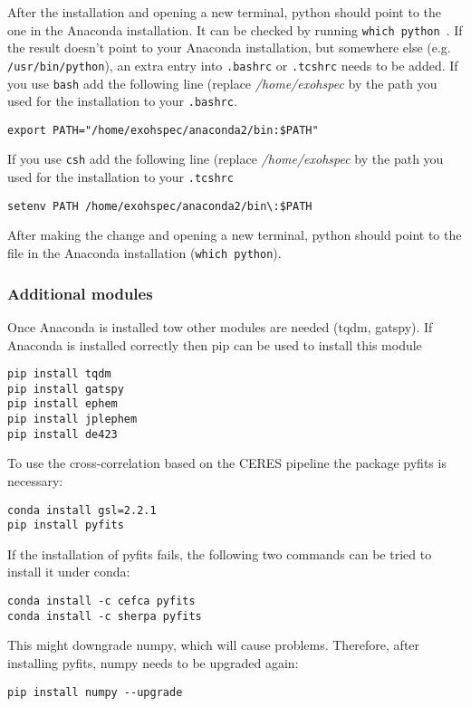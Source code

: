 \documentclass[10pt,a4paper]{article}
\begin{document}
After the installation and opening a new terminal, python should point to the one in the Anaconda installation. It can be checked by running \verb|which python|~. If the result doesn't point to your Anaconda installation, but somewhere else (e.g. \verb|/usr/bin/python|), an extra entry into \verb|.bashrc| or \verb|.tcshrc| needs to be added. If you use \verb|bash| add the following line (replace \textit{/home/exohspec} by the path you used for the installation to your \verb|.bashrc|. %
\begin{lstlisting}[style=base]
export PATH="/home/exohspec/anaconda2/bin:$PATH"
\end{lstlisting}
If you use \verb|csh| add the following line (replace \textit{/home/exohspec} by the path you used for the installation to your \verb|.tcshrc|
\begin{lstlisting}[style=base]
setenv PATH /home/exohspec/anaconda2/bin\:$PATH
\end{lstlisting}

After making the change and opening a new terminal, python should point to the file in the Anaconda installation (\verb|which python|).

\subsubsection{Additional modules}

\noindent Once Anaconda is installed tow other modules are needed (tqdm, gatspy). If Anaconda is installed correctly then pip can be used to install this module
\begin{lstlisting}[style=base]
pip install tqdm
pip install gatspy
pip install ephem
pip install jplephem
pip install de423
\end{lstlisting}

To use the cross-correlation based on the CERES pipeline the package pyfits is necessary:
\begin{lstlisting}[style=base]
conda install gsl=2.2.1
pip install pyfits
\end{lstlisting}

If the installation of pyfits fails, the following two commands can be tried to install it under conda:
\begin{lstlisting}[style=base]
conda install -c cefca pyfits
conda install -c sherpa pyfits
\end{lstlisting}
This might downgrade numpy, which will cause problems. Therefore, after installing pyfits, numpy needs to be upgraded again:
\begin{lstlisting}[style=base]
pip install numpy --upgrade
\end{lstlisting}
\end{document}
